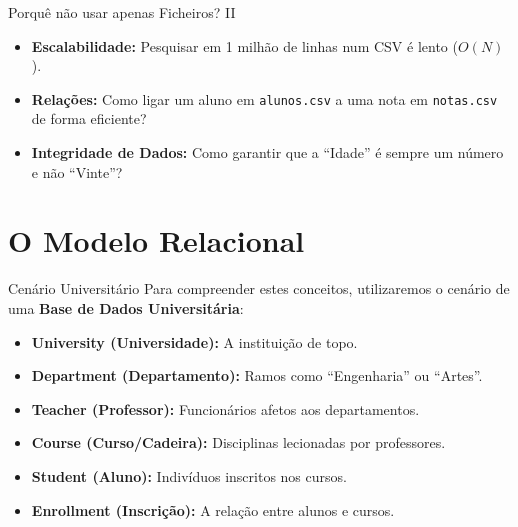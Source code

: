 \documentclass[
  ignorenonframetext,
]{beamer}
\providecommand{\tightlist}{%
  \setlength{\itemsep}{0pt}\setlength{\parskip}{0pt}}
\begin{document}
\begin{frame}[fragile]{Porquê não usar apenas Ficheiros? II}
\protect{}\label{porquuxea-nuxe3o-usar-apenas-ficheiros-ii}
\begin{itemize}
\tightlist
\item
  \textbf{Escalabilidade:} Pesquisar em 1 milhão de linhas num CSV é
  lento (\(O(N)\)).
\item
  \textbf{Relações:} Como ligar um aluno em \texttt{alunos.csv} a uma
  nota em \texttt{notas.csv} de forma eficiente?
\item
  \textbf{Integridade de Dados:} Como garantir que a ``Idade'' é sempre
  um número e não ``Vinte''?
\end{itemize}
\end{frame}

\section{O Modelo Relacional}\label{o-modelo-relacional}

\begin{frame}{Cenário Universitário}
\protect{}\label{cenuxe1rio-universituxe1rio}
Para compreender estes conceitos, utilizaremos o cenário de uma
\textbf{Base de Dados Universitária}:

\begin{itemize}
\tightlist
\item
  \textbf{University (Universidade):} A instituição de topo.
\item
  \textbf{Department (Departamento):} Ramos como ``Engenharia'' ou
  ``Artes''.
\item
  \textbf{Teacher (Professor):} Funcionários afetos aos departamentos.
\item
  \textbf{Course (Curso/Cadeira):} Disciplinas lecionadas por
  professores.
\item
  \textbf{Student (Aluno):} Indivíduos inscritos nos cursos.
\item
  \textbf{Enrollment (Inscrição):} A relação entre alunos e cursos.
\end{itemize}
\end{frame}
\end{document}
